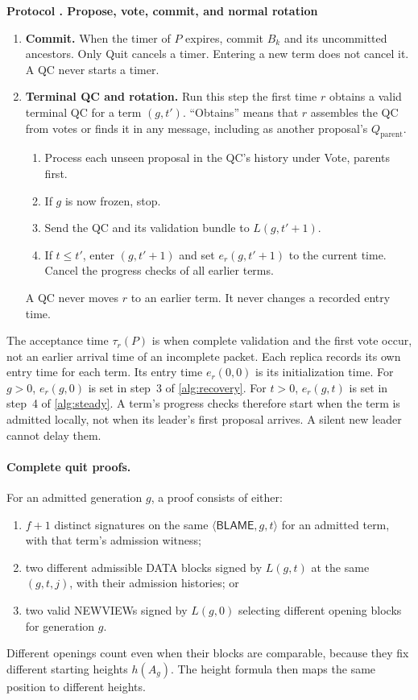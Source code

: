\documentclass[11pt,a4paper]{article}
\newcommand{\RR}[1]{{\color{rrRed}#1}}
\newcommand{\tagg}[1]{\ensuremath{\mathsf{#1}}}
\newcounter{protocol}
\newenvironment{protocol}[2]{\refstepcounter{protocol}\label{#1}
\begin{mdframed}[nobreak=true,linewidth=.6pt,skipabove=8pt,skipbelow=8pt,
innertopmargin=7pt,innerbottommargin=7pt]\small
\textbf{Protocol \theprotocol. #2}\par\smallskip}{\end{mdframed}}
\begin{document}
\begin{protocol}{alg:steady}{Propose, vote, commit, and normal rotation}
\begin{enumerate}[label=\textbf{\arabic*)},itemsep=5pt]
\item \textbf{Commit.} When the timer of $P$ expires, commit $B_k$ and
its uncommitted ancestors. \RR{Only Quit cancels a timer. Entering a
new term does not cancel it. A QC never starts a timer.}

\item \textbf{Terminal QC and rotation.} \RR{Run this step the first time
$r$ obtains a valid terminal QC for a term $(g,t')$.}
\RR{``Obtains'' means that $r$ assembles the QC from votes or finds it in
any message, including as another proposal's
$Q_{\mathrm{parent}}$.}
 \begin{enumerate}[label=(\alph*)]
 \item \RR{Process each unseen proposal in the QC's history under Vote,
       parents first.}
 \item \RR{If $g$ is now frozen, stop.}
 \item \RR{Send the QC and its validation bundle to $L(g,t'+1)$.}
 \item \RR{If $t\le t'$, enter $(g,t'+1)$ and set $e_r(g,t'+1)$ to the
       current time.} \RR{Cancel the progress checks of all earlier
       terms.}
 \end{enumerate}
 \RR{A QC never moves $r$ to an earlier term. It never changes a recorded
 entry time.}
\end{enumerate}
\end{protocol}

The acceptance time $\tau_r(P)$ is when complete validation and the first
vote occur, not an earlier arrival time of an incomplete packet.
Each replica records its own entry time for each term. Its entry time
$e_r(0,0)$ is its initialization time. For $g>0$, $e_r(g,0)$ is set in
step~3 of \cref{alg:recovery}. For $t>0$, $e_r(g,t)$ is set in step~4 of
\cref{alg:steady}. A term's progress checks therefore start when the term
is admitted locally, not when its leader's first proposal arrives. A
silent new leader cannot delay them.


\paragraph{Complete quit proofs.}
For an admitted generation $g$, a proof consists of either:
\begin{enumerate}[label=(\alph*)]
\item $f+1$ distinct signatures on the same $\langle\tagg{BLAME},g,t\rangle$
for an admitted term, with that term's admission witness;
\item two different admissible DATA blocks signed by $L(g,t)$ at the same
$(g,t,j)$, with their admission histories; or
\item two valid NEWVIEWs signed by $L(g,0)$ selecting different opening
blocks for generation $g$.
\end{enumerate}
Different openings count even when their blocks are comparable, because
they fix different starting heights $h(A_g)$. The height formula then
maps the same position to different heights.
\end{document}
